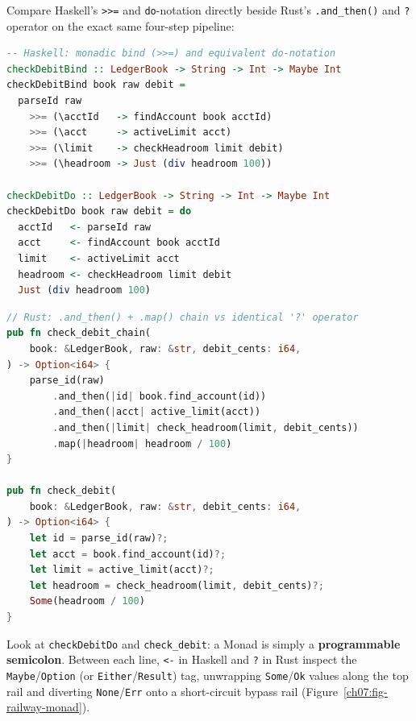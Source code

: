 Compare Haskell's \texttt{>>=} and \texttt{do}-notation directly beside Rust's
\texttt{.and\_then()} and \texttt{?} operator on the exact same four-step pipeline:

\begin{lstlisting}[language=Haskell]
-- Haskell: monadic bind (>>=) and equivalent do-notation
checkDebitBind :: LedgerBook -> String -> Int -> Maybe Int
checkDebitBind book raw debit =
  parseId raw
    >>= (\acctId   -> findAccount book acctId)
    >>= (\acct     -> activeLimit acct)
    >>= (\limit    -> checkHeadroom limit debit)
    >>= (\headroom -> Just (div headroom 100))

checkDebitDo :: LedgerBook -> String -> Int -> Maybe Int
checkDebitDo book raw debit = do
  acctId   <- parseId raw
  acct     <- findAccount book acctId
  limit    <- activeLimit acct
  headroom <- checkHeadroom limit debit
  Just (div headroom 100)
\end{lstlisting}

\begin{lstlisting}[language=Rust]
// Rust: .and_then() + .map() chain vs identical '?' operator
pub fn check_debit_chain(
    book: &LedgerBook, raw: &str, debit_cents: i64,
) -> Option<i64> {
    parse_id(raw)
        .and_then(|id| book.find_account(id))
        .and_then(|acct| active_limit(acct))
        .and_then(|limit| check_headroom(limit, debit_cents))
        .map(|headroom| headroom / 100)
}

pub fn check_debit(
    book: &LedgerBook, raw: &str, debit_cents: i64,
) -> Option<i64> {
    let id = parse_id(raw)?;
    let acct = book.find_account(id)?;
    let limit = active_limit(acct)?;
    let headroom = check_headroom(limit, debit_cents)?;
    Some(headroom / 100)
}
\end{lstlisting}

Look at \texttt{checkDebitDo} and \texttt{check\_debit}: a Monad is simply a
\textbf{programmable semicolon}. Between each line, \texttt{<-} in Haskell and
\texttt{?} in Rust inspect the \texttt{Maybe}/\texttt{Option} (or \texttt{Either}/\texttt{Result})
tag, unwrapping \texttt{Some}/\texttt{Ok} values along the top rail and diverting
\texttt{None}/\texttt{Err} onto a short-circuit bypass rail (Figure~\ref{ch07:fig-railway-monad}).

